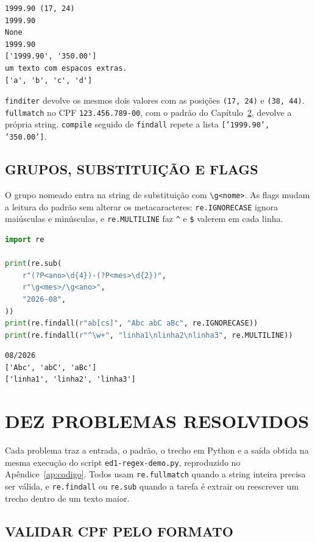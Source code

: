 \documentclass[
    12pt,
    oneside,
    a4paper,
    chapter=TITLE,
    section=TITLE,
    sumario=abnt-6027-2012
]{abntex2}
\begin{document}
\begin{lstlisting}
1999.90 (17, 24)
1999.90
None
1999.90
['1999.90', '350.00']
um texto com espacos extras.
['a', 'b', 'c', 'd']
\end{lstlisting}

\texttt{finditer} devolve os mesmos dois valores com as posições \texttt{(17, 24)} e \texttt{(38, 44)}. \texttt{fullmatch} no CPF \texttt{123.456.789-00}, com o padrão do Capítulo~\ref{cap:problemas}, devolve a própria string. \texttt{compile} seguido de \texttt{findall} repete a lista \texttt{['1999.90', '350.00']}.

\section{GRUPOS, SUBSTITUIÇÃO E FLAGS}
\label{sec:flags}

O grupo nomeado entra na string de substituição com \verb|\g<nome>|. As flags mudam a leitura do padrão sem alterar os metacaracteres: \texttt{re.IGNORECASE} ignora maiúsculas e minúsculas, e \texttt{re.MULTILINE} faz \verb|^| e \verb|$| valerem em cada linha.

\begin{lstlisting}[language=Python]
import re

print(re.sub(
    r"(?P<ano>\d{4})-(?P<mes>\d{2})",
    r"\g<mes>/\g<ano>",
    "2026-08",
))
print(re.findall(r"ab[cs]", "Abc abC aBc", re.IGNORECASE))
print(re.findall(r"^\w+", "linha1\nlinha2\nlinha3", re.MULTILINE))
\end{lstlisting}

\begin{lstlisting}
08/2026
['Abc', 'abC', 'aBc']
['linha1', 'linha2', 'linha3']
\end{lstlisting}

\chapter{DEZ PROBLEMAS RESOLVIDOS}
\label{cap:problemas}

Cada problema traz a entrada, o padrão, o trecho em Python e a saída obtida na mesma execução do script \texttt{ed1-regex-demo.py}, reproduzido no Apêndice~\ref{ap:codigo}. Todos usam \texttt{re.fullmatch} quando a string inteira precisa ser válida, e \texttt{re.findall} ou \texttt{re.sub} quando a tarefa é extrair ou reescrever um trecho dentro de um texto maior.

\section{VALIDAR CPF PELO FORMATO}
\label{sec:cpf}
\end{document}
